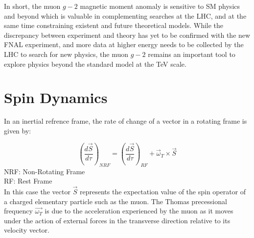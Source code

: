 \documentclass{outhesis}
\begin{document}

In short, the muon $g-2$ magnetic moment anomaly is sensitive to SM physics and beyond which is valuable in complementing searches at the LHC, and at the same time constraining existent and future theoretical models. While the discrepancy between experiment and theory has yet to be confirmed with the new FNAL experiment, and more data at higher energy needs to be collected by the LHC to search for new physics, the muon $g-2$ remains an important tool to explore physics beyond the standard model at the TeV scale.

\appendix
\setcounter{chapter}{0}  %
 \chapter{Spin Dynamics}
 \label{app:bmt}

In an inertial refrence frame, the rate of change of a vector in a rotating frame is given by: 

\begin{equation}
\label{eq:ds}
\left(\frac{d \overrightarrow{S}}{d\tau}\right)_{NRF} = \left(\frac{d \overrightarrow{S}}{d\tau}\right)_{RF} + \overrightarrow{\omega}_T \times \overrightarrow{S}
\end{equation}
NRF: Non-Rotating Frame\\
RF: Rest Frame\\

In this case the vector $\overrightarrow{S}$ represents the expectation value of the spin operator of a charged elementary particle such as the muon. The Thomas precessional frequency $\overrightarrow{\omega_T}$ is due to the acceleration experienced by the muon as it moves under the action 
of external forces in the transverse direction relative to its velocity vector. 
\end{document}
